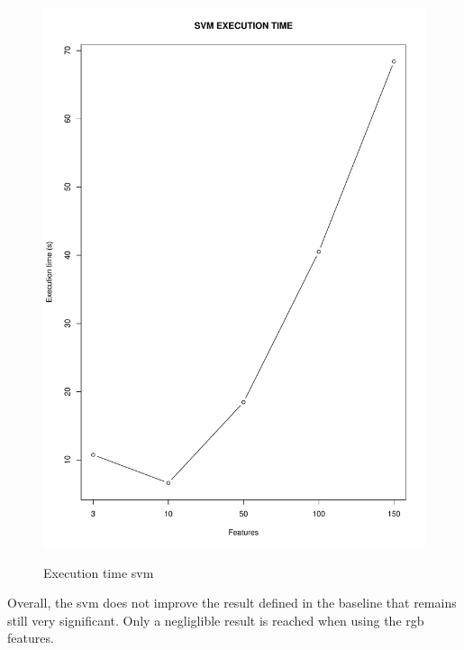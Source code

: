 \documentclass{article}
\begin{document}
\begin{figure}[H]
\begin{adjustwidth}{-4cm}{-4cm}
{    \includegraphics[scale=0.3]{../svm_time_rgb.pdf}  
     }
     \centering
     \caption{Execution time svm}
      \end{adjustwidth}
   \end{figure}
\noindent Overall, the svm does not improve the result defined in the baseline that remains still very significant. Only a negliglible result is reached when using the rgb features. \\
\end{document}
